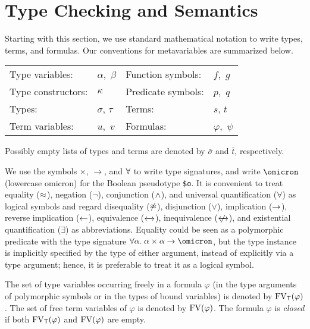 \section{Type Checking and Semantics} \label{sec_semantics}

 Starting with this section, we use standard
mathematical notation to write types, terms, and formulas. Our conventions
for metavariables are summarized below.
%
\begin{center}
\begin{tabular}{l@{\enskip}l@{\qquad\quad}l@{\enskip}l}
Type variables: & $\alpha,$ $\beta$ &
  Function symbols: & $f,$ $g$ \\
Type constructors: & $\kappa$ &
  Predicate symbols: & $p,$ $q$ \\
Types: & $\sigma$, $\tau$ &
  Terms: & $s$, $t$ \\
Term variables: & $u,$ $v$ &
  Formulas: & $\varphi,$ $\psi$
\end{tabular}
\end{center}
Possibly empty lists of types and terms are denoted by $\bar{\sigma}$ and
$\bar{t}$, respectively.

We use the symbols ${\times}$, ${\to}$, and ${\forall}$
to write type signatures, and write $\omicron$ (lowercase omicron) for the
Boolean pseudotype {\tt \$o}. It is convenient to treat
equality ($\approx$), negation ($\lnot$), conjunction ($\mathrel{\land}$), and universal
quantification ($\forall$) as logical symbols and regard disequality
($\not\approx$), disjunction ($\lor$), implication ($\rightarrow$), reverse implication
($\leftarrow$), equivalence ($\leftarrow\kern-1.75ex\rightarrow$), inequivalence ($\kern.4875ex\not\kern-.4875ex\leftarrow\kern-1.75ex\rightarrow$), and existential
quantification ($\exists$) as abbreviations.
%
Equality could be seen as a polymorphic predicate with the type signature
$\forall\alpha.\mskip4.5mu \alpha\times\alpha\to\omicron$, but the type instance is
implicitly specified by the type of either argument, instead of explicitly via a
type argument; hence, it is preferable to treat it as a logical symbol.

The set of type variables occurring freely in a formula $\varphi$
(in the type arguments of polymorphic symbols or
in the types of bound variables) is denoted by $\mathrm{FV}_\mathsf{T}(\varphi)$.
The set of free term variables of $\varphi$
is denoted by $\mathrm{FV}(\varphi)$. The formula $\varphi$ is {\em closed\/}
if both $\mathrm{FV}_\mathsf{T}(\varphi)$ and $\mathrm{FV}(\varphi)$ are empty.

